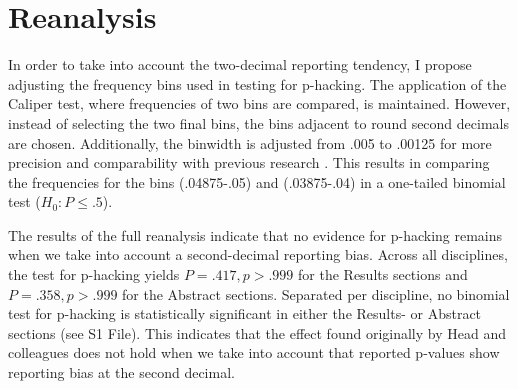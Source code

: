 \section*{Reanalysis}
In order to take into account the two-decimal reporting tendency, I propose adjusting the frequency bins used in testing for p-hacking. The application of the Caliper test, where frequencies of two bins are compared, is maintained. However, instead of selecting the two final bins, the bins adjacent to round second decimals are chosen. Additionally, the binwidth is adjusted from .005 to .00125 for more precision and comparability with previous research \cite{Masicampo2012, Leggett2013}. This results in comparing the frequencies for the bins (.04875-.05) and (.03875-.04) in a one-tailed binomial test ($H_0: P \leq .5$).

The results of the full reanalysis indicate that no evidence for p-hacking remains when we take into account a second-decimal reporting bias. Across all disciplines, the test for p-hacking yields $P=.417,p>.999$ for the Results sections and $P=.358,p>.999$ for the Abstract sections. Separated per discipline, no binomial test for p-hacking is statistically significant in either the Results- or Abstract sections (see S1 File). This indicates that the effect found originally by Head and colleagues does not hold when we take into account that reported p-values show reporting bias at the second decimal.
  
  